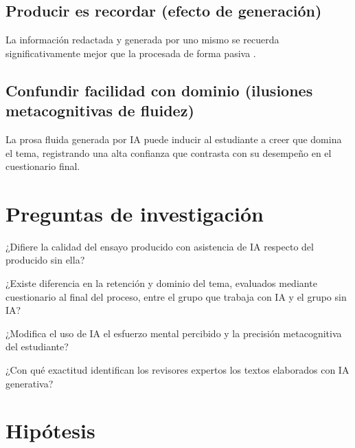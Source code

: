 \documentclass[12pt,a4paper,openany]{report}
\begin{document}
    \subsection{Producir es recordar (efecto de generaci\'on)}
    La informaci\'on redactada y generada por uno mismo se recuerda significativamente mejor que la procesada de forma pasiva \citep{slamecka1978generation}.
    
    \subsection{Confundir facilidad con dominio (ilusiones metacognitivas de fluidez)}
    La prosa fluida generada por IA puede inducir al estudiante a creer que domina el tema, registrando una alta confianza que contrasta con su desempeño en el cuestionario final.
    
    \section{Preguntas de investigaci\'on}
    
    \begin{description}[leftmargin=2.2cm,style=nextline,font=\bfseries\sffamily]
        \item[PI1.] ¿Difiere la calidad del ensayo producido con asistencia de IA respecto del producido sin ella?
        \item[PI2.] ¿Existe diferencia en la retenci\'on y dominio del tema, evaluados mediante cuestionario al final del proceso, entre el grupo que trabaja con IA y el grupo sin IA?
        \item[PI3.] ¿Modifica el uso de IA el esfuerzo mental percibido y la precisi\'on metacognitiva del estudiante?
        \item[PI4.] ¿Con qu\'e exactitud identifican los revisores expertos los textos elaborados con IA generativa?
    \end{description}
    
    \section{Hip\'otesis}
    
\end{document}
